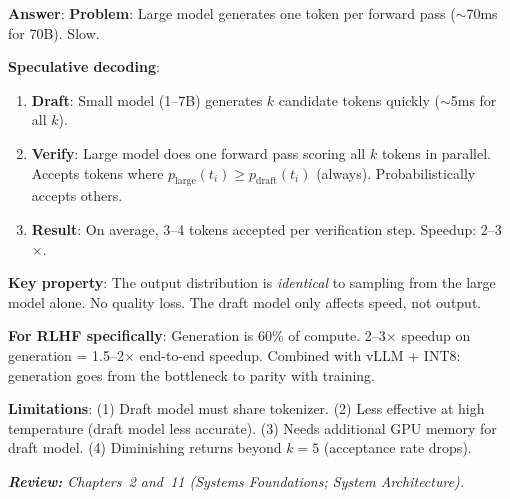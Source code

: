 \begin{questionbox}
\textbf{Answer}: \textbf{Problem}: Large model generates one token per forward pass ($\sim$70ms for 70B). Slow.

\textbf{Speculative decoding}:

\begin{enumerate}
  \item \textbf{Draft}: Small model (1--7B) generates $k$ candidate tokens quickly ($\sim$5ms for all $k$).
  \item \textbf{Verify}: Large model does one forward pass scoring all $k$ tokens in parallel. Accepts tokens where $p_\text{large}(t_i) \geq p_\text{draft}(t_i)$ (always). Probabilistically accepts others.
  \item \textbf{Result}: On average, 3--4 tokens accepted per verification step. Speedup: 2--3$\times$.
\end{enumerate}

\textbf{Key property}: The output distribution is \emph{identical} to sampling from the large model alone. No quality loss. The draft model only affects speed, not output.

\textbf{For RLHF specifically}: Generation is 60\% of compute. 2--3$\times$ speedup on generation = 1.5--2$\times$ end-to-end speedup. Combined with vLLM + INT8: generation goes from the bottleneck to parity with training.

\textbf{Limitations}: (1) Draft model must share tokenizer. (2) Less effective at high temperature (draft model less accurate). (3) Needs additional GPU memory for draft model. (4) Diminishing returns beyond $k=5$ (acceptance rate drops).

\emph{\textbf{Review:} Chapters~2 and~11 (Systems Foundations; System Architecture).}
\end{questionbox}

